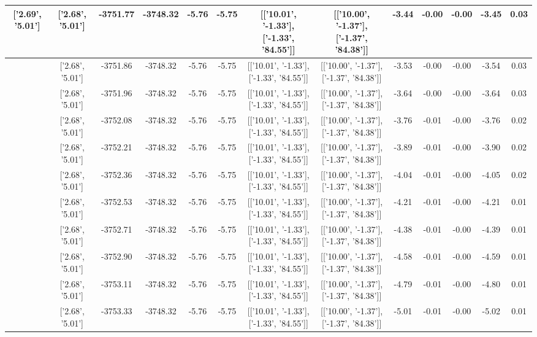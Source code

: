 \begin{table}[htbp]
\begin{adjustbox}{angle=90}
\begin{tabular}{|c|c|c|c|c|c|c|c|c|c|c|c|c|}
 ['2.69', '5.01'] & ['2.68', '5.01'] & -3751.77 & -3748.32 & -5.76 & -5.75 & [['10.01', '-1.33'], ['-1.33', '84.55']] & [['10.00', '-1.37'], ['-1.37', '84.38']] & -3.44 & -0.00 & -0.00 & -3.45 & 0.03\\ \hline
 ['2.69', '5.01'] & ['2.68', '5.01'] & -3751.86 & -3748.32 & -5.76 & -5.75 & [['10.01', '-1.33'], ['-1.33', '84.55']] & [['10.00', '-1.37'], ['-1.37', '84.38']] & -3.53 & -0.00 & -0.00 & -3.54 & 0.03\\ \hline
 ['2.69', '5.01'] & ['2.68', '5.01'] & -3751.96 & -3748.32 & -5.76 & -5.75 & [['10.01', '-1.33'], ['-1.33', '84.55']] & [['10.00', '-1.37'], ['-1.37', '84.38']] & -3.64 & -0.00 & -0.00 & -3.64 & 0.03\\ \hline
 ['2.70', '5.01'] & ['2.68', '5.01'] & -3752.08 & -3748.32 & -5.76 & -5.75 & [['10.01', '-1.33'], ['-1.33', '84.55']] & [['10.00', '-1.37'], ['-1.37', '84.38']] & -3.76 & -0.01 & -0.00 & -3.76 & 0.02\\ \hline
 ['2.70', '5.01'] & ['2.68', '5.01'] & -3752.21 & -3748.32 & -5.76 & -5.75 & [['10.01', '-1.33'], ['-1.33', '84.55']] & [['10.00', '-1.37'], ['-1.37', '84.38']] & -3.89 & -0.01 & -0.00 & -3.90 & 0.02\\ \hline
 ['2.70', '5.01'] & ['2.68', '5.01'] & -3752.36 & -3748.32 & -5.76 & -5.75 & [['10.01', '-1.33'], ['-1.33', '84.55']] & [['10.00', '-1.37'], ['-1.37', '84.38']] & -4.04 & -0.01 & -0.00 & -4.05 & 0.02\\ \hline
 ['2.70', '5.01'] & ['2.68', '5.01'] & -3752.53 & -3748.32 & -5.76 & -5.75 & [['10.01', '-1.33'], ['-1.33', '84.55']] & [['10.00', '-1.37'], ['-1.37', '84.38']] & -4.21 & -0.01 & -0.00 & -4.21 & 0.01\\ \hline
 ['2.70', '5.01'] & ['2.68', '5.01'] & -3752.71 & -3748.32 & -5.76 & -5.75 & [['10.01', '-1.33'], ['-1.33', '84.55']] & [['10.00', '-1.37'], ['-1.37', '84.38']] & -4.38 & -0.01 & -0.00 & -4.39 & 0.01\\ \hline
 ['2.70', '5.01'] & ['2.68', '5.01'] & -3752.90 & -3748.32 & -5.76 & -5.75 & [['10.01', '-1.33'], ['-1.33', '84.55']] & [['10.00', '-1.37'], ['-1.37', '84.38']] & -4.58 & -0.01 & -0.00 & -4.59 & 0.01\\ \hline
 ['2.70', '5.02'] & ['2.68', '5.01'] & -3753.11 & -3748.32 & -5.76 & -5.75 & [['10.01', '-1.33'], ['-1.33', '84.55']] & [['10.00', '-1.37'], ['-1.37', '84.38']] & -4.79 & -0.01 & -0.00 & -4.80 & 0.01\\ \hline
 ['2.70', '5.02'] & ['2.68', '5.01'] & -3753.33 & -3748.32 & -5.76 & -5.75 & [['10.01', '-1.33'], ['-1.33', '84.55']] & [['10.00', '-1.37'], ['-1.37', '84.38']] & -5.01 & -0.01 & -0.00 & -5.02 & 0.01\\ \hline

\end{tabular}
\end{adjustbox}
\end{table}
